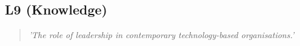 \subsection*{L9 (Knowledge)}

  \begin{quote}
    \textit{'The role of leadership in contemporary
    technology-based organisations.'}
  \end{quote}

\newpage